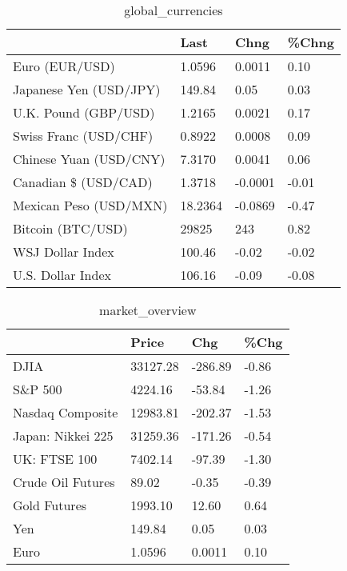 \documentclass{article}%
\begin{document}
%


\begin{table}[htbp]%
\caption{global\_currencies}%
\centering%
\begin{adjustbox}{width=1\textwidth}%
\begin{tabular}{llll}
\toprule
                       &    Last &    Chng & \%Chng \\
\midrule
        Euro (EUR/USD) &  1.0596 &  0.0011 &  0.10 \\
Japanese Yen (USD/JPY) &  149.84 &    0.05 &  0.03 \\
  U.K. Pound (GBP/USD) &  1.2165 &  0.0021 &  0.17 \\
 Swiss Franc (USD/CHF) &  0.8922 &  0.0008 &  0.09 \\
Chinese Yuan (USD/CNY) &  7.3170 &  0.0041 &  0.06 \\
  Canadian \$ (USD/CAD) &  1.3718 & -0.0001 & -0.01 \\
Mexican Peso (USD/MXN) & 18.2364 & -0.0869 & -0.47 \\
     Bitcoin (BTC/USD) &   29825 &     243 &  0.82 \\
      WSJ Dollar Index &  100.46 &   -0.02 & -0.02 \\
     U.S. Dollar Index &  106.16 &   -0.09 & -0.08 \\
\bottomrule
\end{tabular}
%
\end{adjustbox}%
\end{table}

%


\begin{table}[htbp]%
\caption{market\_overview}%
\centering%
\begin{adjustbox}{width=1\textwidth}%
\begin{tabular}{llll}
\toprule
                  &    Price &     Chg &  \%Chg \\
\midrule
             DJIA & 33127.28 & -286.89 & -0.86 \\
          S\&P 500 &  4224.16 &  -53.84 & -1.26 \\
 Nasdaq Composite & 12983.81 & -202.37 & -1.53 \\
Japan: Nikkei 225 & 31259.36 & -171.26 & -0.54 \\
     UK: FTSE 100 &  7402.14 &  -97.39 & -1.30 \\
Crude Oil Futures &    89.02 &   -0.35 & -0.39 \\
     Gold Futures &  1993.10 &   12.60 &  0.64 \\
              Yen &   149.84 &    0.05 &  0.03 \\
             Euro &   1.0596 &  0.0011 &  0.10 \\
\bottomrule
\end{tabular}
%
\end{adjustbox}%
\end{table}

%
\end{document}

